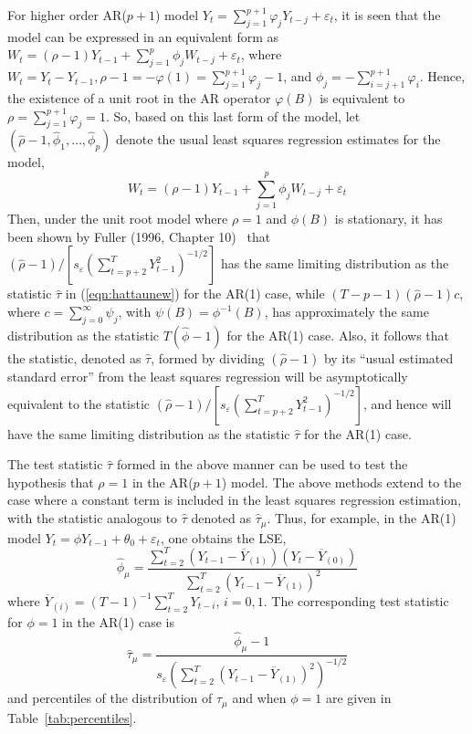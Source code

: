 For higher order AR($p+1$) model $Y_t = \sum_{j=1}^{p+1}\varphi_jY_{t-j} + \varepsilon_t$, it is seen that the model can be expressed in an equivalent form as $W_t = (\rho - 1)Y_{t-1} + \sum_{j=1}^p\phi_jW_{t-j} + \varepsilon_t$, where $W_t = Y_t - Y_{t-1}, \rho - 1 = -\varphi(1) = \sum_{j=1}^{p+1}\varphi_j - 1$, and $\phi_j = -\sum_{i=j+1}^{p+1}\varphi_i$. Hence, the existence of a unit root in the AR operator $\varphi(B)$ is equivalent to $\rho = \sum_{j=1}^{p+1}\varphi_j = 1$. So, based on this last form of the model, let $(\hat{\rho} - 1,\hat{\phi}_1,\ldots,\hat{\phi}_p)$ denote the usual least squares regression estimates for the model, 
	\begin{equation}\label{eqn:wtnew}
	W_t  = (\rho - 1)Y_{t-1} + \sum_{j=1}^p\phi_jW_{t-j} + \varepsilon_t 
	\end{equation}
Then, under the unit root model where $\rho = 1$ and $\phi(B)$ is stationary, it has been shown by Fuller (1996, Chapter 10)~\cite{fuller1996} that $(\hat{\rho} - 1)/[s_\varepsilon(\sum_{t=p+2}^TY_{t-1}^2)^{-1/2}]$ has the same limiting distribution as the statistic $\hat{\tau}$ in (\ref{eqn:hattaunew}) for the AR(1) case, while $(T- p - 1)(\hat{\rho} - 1)c$, where $c = \sum_{j=0}^\infty\psi_j$, with $\psi(B) = \phi^{-1}(B)$, has approximately the same distribution as the statistic $T(\hat{\phi} - 1)$ for the AR(1) case. Also, it follows that the statistic, denoted as $\hat{\tau}$, formed by dividing $(\hat{\rho} - 1)$ by its ``usual estimated standard error'' from the least squares regression will be asymptotically equivalent to the statistic $(\hat{\rho} - 1)/[s_{\varepsilon}(\sum_{t=p+2}^T Y_{t-1}^2)^{-1/2}]$, and hence will have the same limiting distribution as the statistic $\hat{\tau}$ for the AR(1) case.


The test statistic $\hat{\tau}$ formed in the above manner can be used to test the hypothesis that $\rho = 1$ in the AR($p+1$) model. The above methods extend to the case where a constant term is included in the least squares regression estimation, with the statistic analogous to $\hat{\tau}$ denoted as $\hat{\tau}_\mu$. Thus, for example, in the AR(1) model $Y_t = \phi Y_{t-1} + \theta_0 + \varepsilon_t$, one obtains the LSE,
	\begin{equation}\label{eqn:hatphinewest}
	\widehat{\phi}_{\mu} = \dfrac{\sum_{t=2}^T(Y_{t-1} - \overline{Y}_{(1)})(Y_t - \overline{Y}_{(0)})}{\sum_{t=2}^T(Y_{t-1} - \overline{Y}_{(1)})^2}
	\end{equation}
where $\overline{Y}_{(i)} = (T - 1)^{-1}\sum_{t=2}^TY_{t-i}$, $i = 0,1$. The corresponding test statistic for $\phi = 1$ in the AR(1) case is
	\begin{equation}\label{eqn:anotherhattau}
	\hat{\tau}_\mu = \dfrac{\widehat{\phi}_\mu - 1}{s_{\varepsilon} \left( \sum_{t=2}^T(Y_{t-1} - \overline{Y}_{(1)})^2 \right)^{-1/2}}
	\end{equation}
and percentiles of the distribution of $\hat{\tau}_\mu$ and when $\phi = 1$ are given in Table~\ref{tab:percentiles}.



